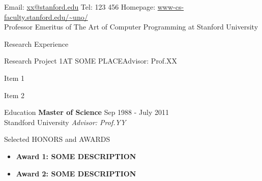 \documentclass[10pt,a4paper]{resume}
\newcommand{\wtspace}{\hspace{1mm}}
\begin{document}
\sloppy  %
\vspace{-12mm}
   

\nobreakvspace{0.3em}  %

\noindent Email: \href{mailto:xx@stanford.edu}{xx\mbox{}@\mbox{}stanford.edu}\sbull
Tel: \textsmaller{+}123 456\sbull
\renewcommand\UrlFont{\rmfamily}
Homepage: \url{www-cs-faculty.stanford.edu/~uno/}
\\
Professor Emeritus of The Art of Computer Programming at Stanford University


\begin{rSection}{Research Experience}
	\begin{rSubsection}{Research Project 1}{}{AT SOME PLACE}{Advisor: Prof.\wtspace XX} 
		\item Item 1
		\item Item 2
	\end{rSubsection} 
\end{rSection}

\begin{rSection}{Education}
	{\bf Master of Science} \hfill {Sep 1988 - July 2011}
	\\ 
	Standford University\hspace{28mm} \textit{Advisor: Prof.\wtspace YY}
\end{rSection}

\begin{rAward}{Selected HONORS and AWARDS}
	\begin{itemize}
		\item {\bf Award 1: SOME DESCRIPTION}
			\item {\bf Award 2: SOME DESCRIPTION}
	\end{itemize}
	
\end{rAward}
\end{document}
